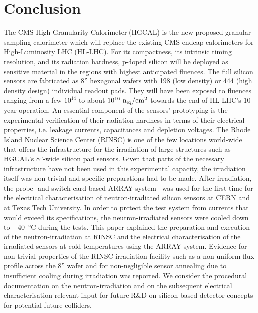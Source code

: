 \section{Conclusion}
\label{sec:conclusion}
The CMS High Granularity Calorimeter (HGCAL) is the new proposed granular sampling calorimeter which will replace the existing CMS endcap calorimeters for High-Luminosity LHC (HL-LHC).
For its compactness, its intrinsic timing resolution, and its radiation hardness, p-doped silicon will be deployed as sensitive material in the regions with highest anticipated fluences.
The full silicon sensors are fabricated as 8'' hexagonal wafers with 198 (low density) or 444 (high density design) individual readout pads.
They will have been exposed to fluences ranging from  a few $10^{14}$ to about $10^{16}~\mathrm{n_{eq}}/\mathrm{cm}^{2}$ towards the end of HL-LHC's 10-year operation.%
An essential component of the sensors' prototyping is the experimental verification of their radiation hardness in terms of their electrical properties, i.e. leakage currents, capacitances and depletion voltages.
The Rhode Island Nuclear Science Center (RINSC) is one of the few locations world-wide that offers the infrastructure for the irradiation of large structures such as HGCAL's 8''-wide silicon pad sensors.
Given that parts of the necessary infrastructure have not been used in this experimental capacity, the irradiation itself was non-trivial and specific preparations had to be made.
After irradiation, the probe- and switch card-based ARRAY system~\cite{pitters:array2019} was used for the first time for the electrical characterisation of neutron-irradiated silicon sensors at CERN and at Texas Tech University.
In order to protect the test system from currents that would exceed its specifications, the neutron-irradiated sensors were cooled down to \SI{-40}{\celsius} during the tests.%
This paper explained the preparation and execution of the neutron-irradiation at RINSC and the electrical characterisation of the irradiated sensors at cold temperatures using the ARRAY system.
Evidence for non-trivial properties of the RINSC irradiation facility such as a non-uniform flux profile across the 8'' wafer and for non-negligible sensor annealing due to insufficient cooling during irradiation was reported.
We consider the procedural documentation on the neutron-irradiation and on the subsequent electrical characterisation relevant input for future R$\&$D on silicon-based detector concepts for potential future colliders.%
